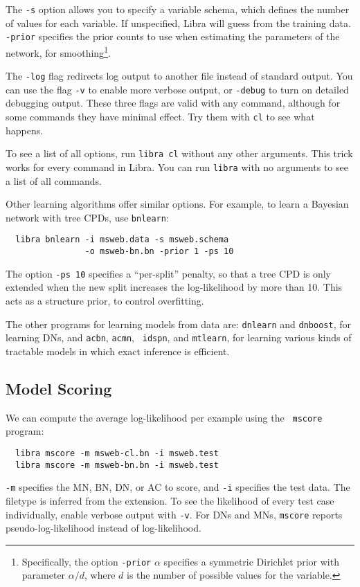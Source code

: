 \documentclass[11pt]{article}
\begin{document}
The {\tt -s} option allows you to specify a variable schema, which
defines the number of values for each variable.  If unspecified, Libra
will guess from the training data.  {\tt -prior} specifies the prior
counts to use when estimating the parameters of the network, for
smoothing\footnote{Specifically, the option {\tt -prior} $\alpha$
specifies a symmetric Dirichlet prior with parameter $\alpha/d$,
where $d$ is the number of possible values for the variable.}.

The {\tt -log} flag redirects log output to another file
instead of standard output.  You can use the flag {\tt -v} to
enable more verbose output, or {\tt -debug} to turn on detailed
debugging output.  These three flags are valid with any command,
although for some commands they have minimal effect.  Try them with
{\tt cl} to see what happens.

To see a list of all options, run {\tt libra cl} without any other
arguments.  This trick works for every command in Libra.  You can run
{\tt libra} with no arguments to see a list of all commands.

Other learning algorithms offer similar options.  For example, to learn
a Bayesian network with tree CPDs, use {\tt bnlearn}:
\begin{verbatim}
  libra bnlearn -i msweb.data -s msweb.schema
                -o msweb-bn.bn -prior 1 -ps 10
\end{verbatim}
The option {\tt -ps 10} specifies a ``per-split'' penalty, so that a
tree CPD is only extended when the new split increases the log-likelihood
by more than 10.  This acts as a structure prior, to control
overfitting.

The other programs for learning models from data are: {\tt dnlearn}
and {\tt dnboost}, for learning DNs, and {\tt acbn}, {\tt acmn}, {\tt
idspn}, and {\tt mtlearn}, for learning various kinds of tractable
models in which exact inference is efficient.

\subsection{Model Scoring}

We can compute the average log-likelihood per example using the {\tt
mscore} program:
\begin{verbatim}
  libra mscore -m msweb-cl.bn -i msweb.test
  libra mscore -m msweb-bn.bn -i msweb.test
\end{verbatim}
{\tt -m} specifies the MN, BN, DN, or AC to score, and {\tt -i}
specifies the test data.  The filetype is inferred from the extension.
To see the likelihood of every test case individually, enable verbose
output with {\tt -v}.  For DNs and MNs, {\tt mscore} reports
pseudo-log-likelihood instead of log-likelihood.
\end{document}
